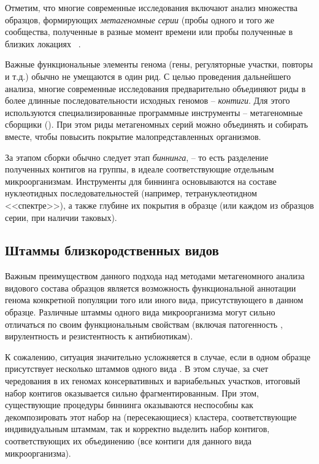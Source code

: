 \documentclass{spbau-diploma}
\begin{document}
Отметим, что многие современные исследования включают анализ множества образцов, формирующих \textit{метагеномные серии} (пробы одного и того же сообщества, полученные в разные момент времени \cite{time_series} или пробы полученные в близких локациях ~\cite{spacial_series_1, spacial_series_2}.

Важные функциональные элементы генома (гены, регуляторные участки, повторы и т.д.) обычно не умещаются в один рид. 
С целью проведения дальнейшего анализа, многие современные исследования предварительно объединяют риды в более длинные последовательности исходных геномов -- \textit{контиги}. Для этого используются специализированные программные инструменты -- метагеномные сборщики (\cite{IDBA-UD, MEGAHIT, MetaVelvet, RayMeta, MetaSpades}). При этом риды метагеномных серий можно объединять и собирать вместе, чтобы повысить покрытие малопредставленных организмов. 

За этапом сборки обычно следует этап \textit{биннинга}, -- то есть разделение полученных контигов на группы, в идеале соответствующие отдельным микроорганизмам. Инструменты для биннинга \cite{CONCOCT, GroopM, MyCC, MetaBAT} основываются на составе нуклеотидных последовательностей (например, тетрануклеотидном <<спектре>>), а также глубине их покрытия в образце (или каждом из образцов серии, при наличии таковых). 


\subsection{Штаммы близкородственных видов}


Важным преимуществом данного подхода над методами метагеномного анализа видового состава образцов является возможность функциональной аннотации генома конкретной популяции того или иного вида, присутствующего в данном образце. Различные штаммы одного вида микроорганизма могут сильно отличаться по своим функциональным свойствам (включая патогенность , вирулентность и резистентность к антибиотикам).

К сожалению, ситуация значительно усложняется  в случае, если в одном образце присутствует несколько штаммов одного вида \cite{StrainEst, metasub, infant_gut}.
В этом случае, за счет чередования в их геномах консервативных и вариабельных участков, итоговый набор контигов оказывается сильно фрагментированным. При этом, существующие процедуры биннинга оказываются неспособны как декомпозировать этот набор на (пересекающиеся) кластера, соответствующие индивидуальным штаммам, так и корректно выделить набор контигов, соответствующих их объединению (все контиги для данного вида микроорганизма).
\end{document}
